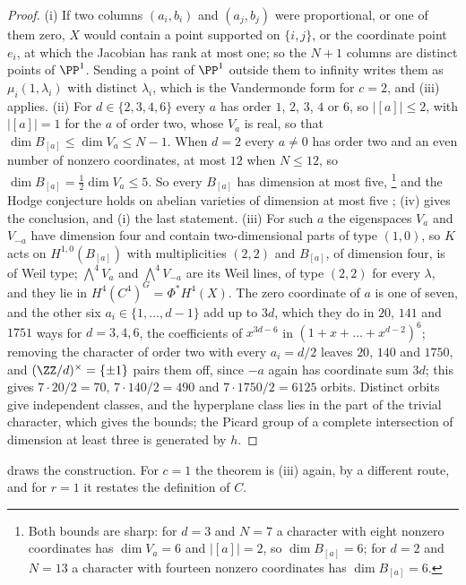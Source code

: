 \begin{proof}
(i) If two columns $(a_{i},b_{i})$ and $(a_{j},b_{j})$ were proportional,
or one of them zero, $X$ would contain a point supported on $\{i,j\}$, or
the coordinate point $e_{i}$, at which the Jacobian has rank at most one;
so the $N+1$ columns are distinct points of $\PP^{1}$. Sending a point of
$\PP^{1}$ outside them to infinity writes them as
$\mu_{i}(1,\lambda_{i})$ with distinct $\lambda_{i}$, which is the
Vandermonde form for $c=2$, and (iii) applies.
(ii) For $d\in\{2,3,4,6\}$ every $a$ has order $1$, $2$, $3$, $4$ or $6$, so
$|[a]|\le2$, with $|[a]|=1$ for the $a$ of order two, whose $V_{a}$ is real,
so that $\dim B_{[a]}\le\dim V_{a}\le N-1$. When $d=2$ every $a\ne0$ has
order two and an even number of nonzero coordinates, at most $12$ when
$N\le12$, so $\dim B_{[a]}=\tfrac12\dim V_{a}\le5$. So every $B_{[a]}$ has
dimension at most five,%
\footnote{Both bounds are sharp: for $d=3$ and $N=7$ a character with eight
nonzero coordinates has $\dim V_{a}=6$ and $|[a]|=2$, so $\dim B_{[a]}=6$;
for $d=2$ and $N=13$ a character with fourteen nonzero coordinates has
$\dim B_{[a]}=6$.} and the Hodge
conjecture holds on abelian varieties of dimension at most five
\cite{Mar25a,Mar25b,MZ99}; (iv) gives the conclusion,
and (i) the last statement.
(iii) For such $a$ the eigenspaces $V_{a}$ and $V_{-a}$ have dimension four
and contain two-dimensional parts of type $(1,0)$, so $K$ acts on
$H^{1,0}(B_{[a]})$ with multiplicities $(2,2)$ and $B_{[a]}$, of dimension
four, is of Weil type; $\bigwedge^{4}V_{a}$ and $\bigwedge^{4}V_{-a}$ are its
Weil lines, of type $(2,2)$ for every $\lambda$, and they lie in
$H^{4}(C^{4})^{G}=\Phi^{*}H^{4}(X)$. The zero coordinate of $a$ is one of
seven, and the other six $a_{i}\in\{1,\dots,d-1\}$ add up to $3d$, which
they do in $20$, $141$ and $1751$ ways for $d=3,4,6$, the coefficients of
$x^{3d-6}$ in $(1+x+\dots+x^{d-2})^{6}$; removing the character of order two
with every $a_{i}=d/2$ leaves $20$, $140$ and $1750$, and $(\ZZ/d)^{\times}=
\{\pm1\}$ pairs them off, since $-a$ again has coordinate sum $3d$; this
gives $7\cdot20/2=70$, $7\cdot140/2=490$ and $7\cdot1750/2=6125$ orbits.
Distinct orbits give independent classes, and the hyperplane class
lies in the part of the trivial character, which gives the bounds; the
Picard group of a complete intersection of dimension at least three is
generated by $h$.
\end{proof}

 draws the construction. For $c=1$ the theorem is (iii) again,
by a different route, and for $r=1$ it restates the definition of $C$.

